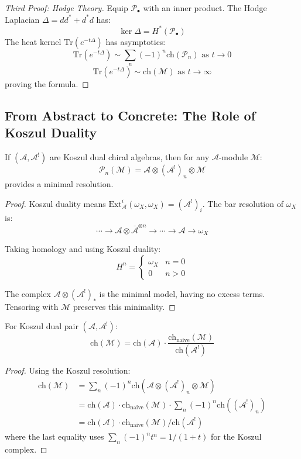 \begin{proof}[Third Proof: Hodge Theory]
Equip $\mathcal{P}_\bullet$ with an inner product. The Hodge Laplacian $\Delta = dd^* + d^*d$ has:
\[
\ker \Delta = H^*(\mathcal{P}_\bullet)
\]
The heat kernel $\text{Tr}(e^{-t\Delta})$ has asymptotics:
\[
\text{Tr}(e^{-t\Delta}) \sim \sum_n (-1)^n \text{ch}(\mathcal{P}_n) \text{ as } t \to 0
\]
\[
\text{Tr}(e^{-t\Delta}) \sim \text{ch}(\mathcal{M}) \text{ as } t \to \infty
\]
proving the formula.
\end{proof}

\subsection{From Abstract to Concrete: The Role of Koszul Duality}

\begin{theorem}
If $(\mathcal{A}, \mathcal{A}^!)$ are Koszul dual chiral algebras, then for any $\mathcal{A}$-module $\mathcal{M}$:
\[
\mathcal{P}_n(\mathcal{M}) = \mathcal{A} \otimes (\mathcal{A}^!)_n \otimes \mathcal{M}
\]
provides a minimal resolution.
\end{theorem}

\begin{proof}
Koszul duality means $\text{Ext}^i_{\mathcal{A}}(\omega_X, \omega_X) = (\mathcal{A}^!)_i$. The bar resolution of $\omega_X$ is:
\[
\cdots \to \mathcal{A} \otimes \overline{\mathcal{A}}^{\otimes n} \to \cdots \to \mathcal{A} \to \omega_X
\]

Taking homology and using Koszul duality:
\[
H^n = \begin{cases} \omega_X & n = 0 \\ 0 & n > 0 \end{cases}
\]

The complex $\mathcal{A} \otimes (\mathcal{A}^!)_* $ is the minimal model, having no excess terms. Tensoring with $\mathcal{M}$ preserves this minimality.
\end{proof}

\begin{corollary}
For Koszul dual pair $(\mathcal{A}, \mathcal{A}^!)$:
\[
\text{ch}(\mathcal{M}) = \text{ch}(\mathcal{A}) \cdot \frac{\text{ch}_{\text{naive}}(\mathcal{M})}{\text{ch}(\mathcal{A}^!)}
\]
\end{corollary}

\begin{proof}
Using the Koszul resolution:
\begin{align}
\text{ch}(\mathcal{M}) &= \sum_n (-1)^n \text{ch}(\mathcal{A} \otimes (\mathcal{A}^!)_n \otimes \mathcal{M}) \\
&= \text{ch}(\mathcal{A}) \cdot \text{ch}_{\text{naive}}(\mathcal{M}) \cdot \sum_n (-1)^n \text{ch}((\mathcal{A}^!)_n) \\
&= \text{ch}(\mathcal{A}) \cdot \text{ch}_{\text{naive}}(\mathcal{M}) / \text{ch}(\mathcal{A}^!)
\end{align}
where the last equality uses $\sum_n (-1)^n t^n = 1/(1+t)$ for the Koszul complex.
\end{proof}

